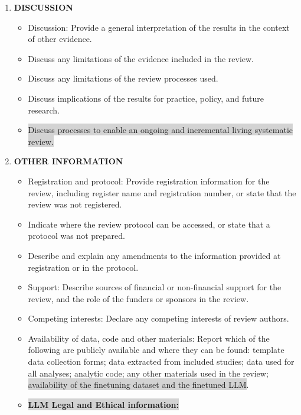 \documentclass{article}
\begin{document}
\begin{enumerate}
    \item \textbf{DISCUSSION}
    \begin{itemize}
        \item[26a.] Discussion: Provide a general interpretation of the results in the context of other evidence.
        \item[26b.] Discuss any limitations of the evidence included in the review.
        \item[26c.] Discuss any limitations of the review processes used.
        \item[26d.] Discuss implications of the results for practice, policy, and future research.
\item[\colorbox{lightgray}{26e.}] \colorbox{lightgray}{Discuss processes to enable an ongoing and incremental living systematic review.}
    \end{itemize}
    
    \item \textbf{OTHER INFORMATION}
    \begin{itemize}
        \item[27a.] Registration and protocol: Provide registration information for the review, including register name and registration number, or state that the review was not registered.
        \item[27b.] Indicate where the review protocol can be accessed, or state that a protocol was not prepared.
        \item[27c.] Describe and explain any amendments to the information provided at registration or in the protocol.
        \item[28.] Support: Describe sources of financial or non-financial support for the review, and the role of the funders or sponsors in the review.
        \item[29.] Competing interests: Declare any competing interests of review authors.
        \item[30.] Availability of data, code and other materials: Report which of the following are publicly available and where they can be found: template data collection forms; data extracted from included studies; data used for all analyses; analytic code; any other materials used in the review; \colorbox{lightgray}{availability of the finetuning dataset and the finetuned LLM}.

    \item[\colorbox{lightgray}{31}] \colorbox{lightgray}{\textbf{LLM Legal and Ethical information:}}


\end{itemize}
\end{enumerate}
\end{document}
